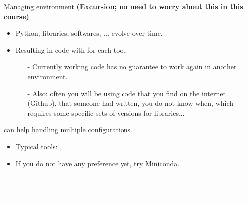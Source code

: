 \begin{frame}{Managing environment}
\textbf{(Excursion; no need to worry about this in this course)}
\vsp
\begin{itemize}
\item Python, libraries, softwares, ... evolve over time.
\item Resulting in code with  for each tool.
\begin{itemize}
\item[-] Currently working code has no guarantee to work again in another environment.\\
\item[-] Also: often you will be using code that you find on the internet (Github), that someone had written, you do not know when, which requires some specific sets of versions for libraries...
\end{itemize}
\end{itemize}
\vsp
{} can help handling multiple configurations.
\begin{itemize}
\item Typical tools: , 
\item If you do not have any preference yet, try Miniconda.\\
\begin{itemize}
\item[-] 
\item[-] 
\end{itemize}
\end{itemize}
\end{frame}


